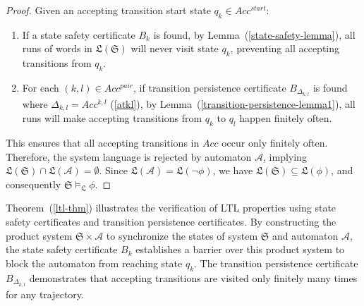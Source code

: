 \documentclass[acmlarge]{acmart}
\begin{document}
\begin{proof}
  Given an accepting transition start state $q_k \in Acc^{start}$:
  \begin{enumerate}
      \item If a state safety certificate $B_k$ is found, by Lemma~(\ref{state-safety-lemma}), all runs of words in $\mathfrak{L}(\mathfrak{S})$ will never visit state $q_k$, preventing all accepting transitions from $q_k$.

      \item For each $(k, l) \in Acc^{pair}$, if transition persistence certificate $B_{\Delta_{k,l}}$ is found where $\Delta_{k,l} = Acc^{k,l}$ (\ref{atkl}), by Lemma~(\ref{transition-persistence-lemma1}), all runs will make accepting transitions from $q_k$ to $q_l$ happen finitely often.
  \end{enumerate}

  This ensures that all accepting transitions in $Acc$ occur only finitely often. Therefore, the system language is rejected by automaton $\mathcal{A}$, implying $\mathfrak{L}(\mathfrak{S}) \cap \mathfrak{L}(\mathcal{A}) = \emptyset$. Since $\mathfrak{L}(\mathcal{A}) = \mathfrak{L}(\neg \phi)$, we have $\mathfrak{L}(\mathfrak{S}) \subseteq \mathfrak{L}(\phi)$, and consequently $\mathfrak{S} \models_{\mathfrak{L}} \phi$.
\end{proof}

Theorem~(\ref{ltl-thm}) illustrates the verification of LTL properties using state safety certificates and transition persistence certificates. By constructing the product system $\mathfrak{S} \times \mathcal{A}$ to synchronize the states of system $\mathfrak{S}$ and automaton $\mathcal{A}$, the state safety certificate $B_k$ establishes a barrier over this product system to block the automaton from reaching state $q_k$. The transition persistence certificate $B_{\Delta_{k,l}}$ demonstrates that accepting transitions are visited only finitely many times for any trajectory.
 
\end{document}
